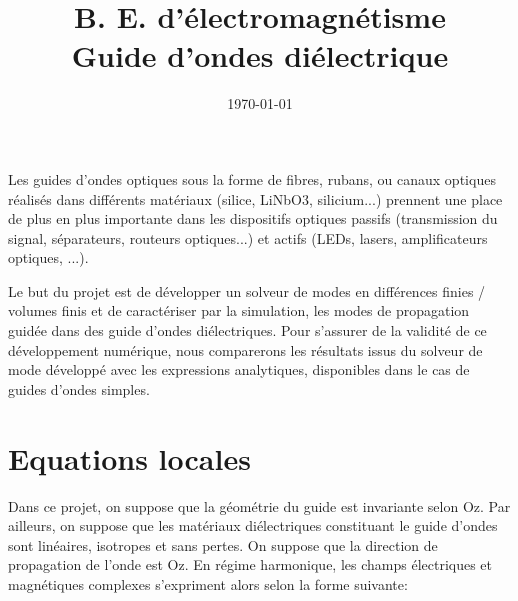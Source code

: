 \documentclass[a4paper, 12pt]{article}
\begin{document}


\title{B. E. d'électromagnétisme \\ Guide d'ondes diélectrique}

\date{\today}
\date{\vspace{-10ex}}
 
\maketitle


\vspace{1cm}

Les guides d'ondes optiques sous la forme de fibres, rubans, ou canaux optiques réalisés dans différents matériaux (silice, LiNbO3, silicium...)
prennent une place de plus en plus importante dans les dispositifs optiques passifs (transmission du signal, séparateurs, routeurs optiques...) et actifs (LEDs, lasers, amplificateurs optiques, ...).

Le but du projet est de développer un solveur de modes en différences finies / volumes finis et de  caractériser par la simulation, les modes de propagation guidée dans des guide d'ondes diélectriques. Pour s'assurer de la validité de ce développement numérique, nous comparerons les résultats issus du solveur de mode développé avec les expressions analytiques, disponibles dans le cas de guides d'ondes simples.

\section{Equations locales}

Dans ce projet, on suppose que la géométrie du guide est invariante  selon Oz. Par ailleurs, on suppose que les matériaux diélectriques constituant le guide d'ondes sont linéaires, isotropes et sans pertes. On suppose que la direction de propagation de l'onde est Oz. En régime harmonique, les champs électriques et magnétiques complexes s'expriment alors selon la forme suivante:
\end{document}
